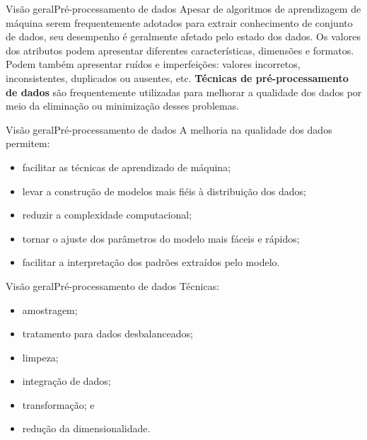 \documentclass[t]{beamer}
\begin{document}

\begin{ftst}{Visão geral}{Pré-processamento de dados}
\justifying
Apesar de algoritmos de aprendizagem de máquina serem frequentemente adotados para extrair conhecimento de conjunto de dados, seu desempenho é geralmente afetado pelo estado dos dados.
\vone
Os valores dos atributos podem apresentar diferentes características, dimensões e formatos.
\vone
Podem também apresentar ruídos e imperfeições: valores incorretos, inconsistentes, duplicados ou ausentes, etc.
\vone
\textbf{Técnicas de pré-processamento de dados} são frequentemente utilizadas para melhorar a qualidade dos dados por meio da eliminação ou minimização desses problemas.
\end{ftst}


\begin{ftst}{Visão geral}{Pré-processamento de dados}
\justifying
A melhoria na qualidade dos dados permitem:
\vone
\begin{itemize}
    \item facilitar as técnicas de aprendizado de máquina;
    \item levar a construção de modelos mais fiéis à distribuição dos dados;
    \item reduzir a complexidade computacional;
    \item tornar o ajuste dos parâmetros do modelo mais fáceis e rápidos;
    \item facilitar a interpretação dos padrões extraídos pelo modelo.
\end{itemize}
\end{ftst}


\begin{ftst}{Visão geral}{Pré-processamento de dados}
\justifying
Técnicas:
\vone
\begin{itemize}
    \item amostragem;
    \item tratamento para dados desbalanceados;
    \item limpeza;
    \item integração de dados;
    \item transformação; e
    \item redução da dimensionalidade.
\end{itemize}
\end{ftst}

\end{document}
